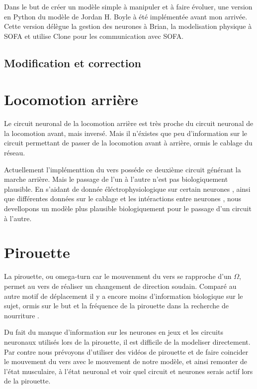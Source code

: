Dans le but de créer un modèle simple à manipuler et à faire évoluer, une version en Python du
modèle de Jordan H. Boyle à été implémentée avant mon arrivée. Cette version délègue la gestion
des neurones à Brian, la modelisation physique à SOFA et utilise Clone pour les communication
avec SOFA.

\subsection{Modification et correction} %
\label{sub:Modification et correction}



\section{Locomotion arrière} %
\label{sec:Locomotion arrière}

Le circuit neuronal de la locomotion arrière est très proche du circuit neuronal de la locomotion
avant, mais inversé\cite{Boyle2009}. Mais il n'éxistes que peu d'information sur le circuit
permettant de passer de la locomotion avant à arrière, ormis le cablage du réseau.

Actuellement l'implémenttion du vers posséde ce deuxième circuit générant la marche arrière. Mais
le passage de l'un à l'autre n'est pas biologiquement plausible. En s'aidant de donnée
éléctrophysiologique sur certain neurones \cite{Mellem2008a,Lockery2009}, ainsi que différentes
données sur le cablage et les intéractions entre neurones
\cite{Chalfie1985,Gray2005,Chen2006,Varshney2011,Leifer2011}, nous devellopons un modèle plus
plausible biologiquement pour le passage d'un circuit à l'autre.


\section{Pirouette} %
\label{sec:Pirouette}

La pirouette, ou omega-turn car le mouvenment du vers se rapproche d'un $\Omega$, permet au vers
de réaliser un changement de direction soudain. Comparé au autre motif de déplacement il y a encore
moins d'information biologique sur le sujet, ormis sur le but et la fréquence de la pirouette dans
la recherche de nourriture \cite{Gray2005}.

Du fait du manque d'information sur les neurones en jeux et les circuits neuronaux utilisés lors de
la pirouette, il est difficile de la modeliser directement. Par contre nous prévoyons d'utiliser des
vidéos de pirouette et de faire coincider le mouvement du vers avec le mouvement de notre modèle, et
ainsi remonter de l'état musculaire, à l'état neuronal et voir quel circuit et neurones serais actif
lors de la pirouette.



